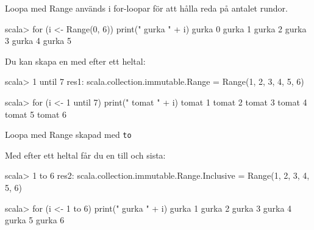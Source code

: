 \begin{Slide}{Loopa med Range}
 används i for-loopar för att hålla reda på antalet rundor.
\begin{REPLnonum}
scala> for (i <- Range(0, 6)) print(" gurka " + i)
 gurka 0 gurka 1 gurka 2 gurka 3 gurka 4 gurka 5
\end{REPLnonum}
Du kan skapa en  med  efter ett heltal:
\begin{REPLnonum}
scala> 1 until 7
res1: scala.collection.immutable.Range =
  Range(1, 2, 3, 4, 5, 6)

scala> for (i <- 1 until 7) print(" tomat " + i)
 tomat 1 tomat 2 tomat 3 tomat 4 tomat 5 tomat 6

\end{REPLnonum}
\end{Slide}

\begin{Slide}{Loopa med Range skapad med \texttt{to}}

Med  efter ett heltal får du en  till och  sista:
\begin{REPLnonum}
scala> 1 to 6
res2: scala.collection.immutable.Range.Inclusive =
  Range(1, 2, 3, 4, 5, 6)

scala> for (i <- 1 to 6) print(" gurka " + i)
 gurka 1 gurka 2 gurka 3 gurka 4 gurka 5 gurka 6

\end{REPLnonum}


\end{Slide}



